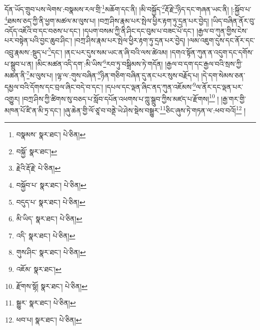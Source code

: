 དོན་ཡོད་གྲུབ་པས་ལེགས་:བསྣམས་རལ་གྲི་\footnote{བསྣམས་  སྣར་ཐང་།  པེ་ཅིན། }མཆོག་དང་ནི། །མི་བསྐྱོད་\footnote{བསྐྱོ་  སྣར་ཐང་། }རྡོ་རྗེ་\footnote{རྗེའི་རྡོ་རྗེ་  པེ་ཅིན། }ཉིད་དང་གཞན་ཡང་ནི། །:སྐྱོབ་པ་\footnote{བསྐྱོབ་པ་  སྣར་ཐང་།  པེ་ཅིན། }ཐམས་ཅད་ཀྱི་ནི་ཕྱག་མཚལ་མ་ལུས་པ། །བཀྲ་ཤིས་རྣམ་པར་སྤེལ་ཕྱིར་རྟག་ཏུ་དྲན་པར་བྱེད། །ཡིད་བཞིན་ནོར་བུ་འདོད་འཇོའི་བ་དང་བཅས་པ་དང་། །དཔག་བསམ་ཀྱི་ནི་ཤིང་དང་བུམ་པ་བཟང་པོ་དང་། །རྒྱལ་བ་ཀུན་གྱིས་ངེས་པར་བསྟེན་པའི་བྱང་ཆུབ་ཤིང་། །བཀྲ་ཤིས་རྣམ་པར་སྤེལ་ཕྱིར་རྟག་ཏུ་དྲན་པར་བྱེད། །ལམ་འཇུག་དུས་དང་ནོར་དང་འབྲུ་རྣམས་:སྡུད་པ་\footnote{བདུད་པ་  སྣར་ཐང་།  པེ་ཅིན། }དང་། །ནང་པར་དུས་སམ་ཡང་ན་ཞི་བའི་ལས་ཚེའམ། །དགའ་སྟོན་ཀུན་ན་འདུག་དང་དགོས་པ་སྒྲུབ་པ་ན། །མིང་མཚན་འདི་དག་:མི་ཡིས་\footnote{མི་ཡིད་  སྣར་ཐང་།  པེ་ཅིན། }རབ་ཏུ་བསྒྲིམས་ཏེ་གདོན། །རྒྱལ་བ་དག་དང་རྒྱལ་བའི་སྲས་ཀྱི་མཚན་ནི་\footnote{འདི་  སྣར་ཐང་།  པེ་ཅིན། }མ་ལུས་པ། །ལྷ་ལ་:གུས་བཞིན་\footnote{གུས་ཤིང་  སྣར་ཐང་།  པེ་ཅིན། }ཉིན་གཅིག་བཞིན་དུ་ནང་པར་སུས་བརྗོད་པ། །དེ་དག་སེམས་ཅན་དམྱལ་བའི་དོགས་དང་བྲལ་ཞིང་བདེ་བ་དང་། །དཔལ་དང་ལྡན་ཞིང་ནད་ཀུན་འཇོམས་\footnote{འཇོམ་  སྣར་ཐང་། }ལ་ནོར་དང་ལྡན་པར་འགྱུར། །བཀྲ་ཤིས་ཀྱི་ཚིགས་སུ་བཅད་པ་སློབ་དཔོན་འཕགས་པ་ཀླུ་སྒྲུབ་ཀྱིས་མཛད་པ་རྫོགས།\footnote{རྫོགས་སྷོ།  སྣར་ཐང་།  པེ་ཅིན། } ། །རྒྱ་གར་གྱི་མཁན་པོ་ཛི་ན་མི་ཏྲ་དང་། །ཞུ་ཆེན་གྱི་ལོ་ཙཱ་བ་བནྡེ་ཡེ་ཤེས་སྡེས་བསྒྱུར་\footnote{སྒྱུར་  སྣར་ཐང་།  པེ་ཅིན། }ཅིང་ཞུས་ཏེ་གཏན་ལ་:ཕབ་བའོ།\footnote{ཕབ་པ།  སྣར་ཐང་།  པེ་ཅིན། } །